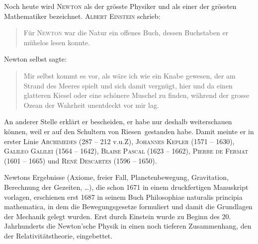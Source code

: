 \documentclass[%
11pt,%
twoside,%
titlepage,%
german,%
headsepline%
]{scrartcl}
\theoremstyle{definition}
\theoremstyle{plain}
\begin{document}
Noch heute wird \textsc{Newton} als der grösste Physiker und als einer der grössten Mathematiker bezeichnet. \textsc{Albert Einstein} schrieb:
\begin{quote}
\glqq Für \textsc{Newton} war die Natur ein offenes Buch, dessen Buchstaben er mühelos lesen konnte.\grqq
\end{quote}
Newton selbst sagte: 
\begin{quote}
\glqq Mir selbst kommt es vor, als wäre ich wie ein Knabe gewesen, der am Strand des Meeres spielt und sich damit vergnügt, hier und da einen glatteren Kiesel oder eine schönere Muschel zu finden, während der grosse Ozean der Wahrheit unentdeckt vor mir lag.\grqq
\end{quote}
An anderer Stelle erklärt er bescheiden, er habe nur deshalb weiterschauen können, weil er auf den \glqq Schultern von Riesen\grqq\ gestanden habe. Damit meinte er in erster Linie \textsc{Archimedes} (287 -- 212 v.u.Z), \textsc{Johannes Kepler} (1571 -- 1630), \textsc{Galileo Galilei} (1564 -- 1642), \textsc{Blaise Pascal} (1623 -- 1662), \textsc{Pierre de Fermat} (1601 -- 1665) und \textsc{Ren\'e Descartes} (1596 -- 1650).

Newtons Ergebnisse (Axiome, freier Fall, Planetenbewegung, Gravitation, Berechnung der Gezeiten, \dots), die schon 1671 in einem druckfertigen Manuskript vorlagen, erschienen erst 1687 in seinem Buch \glqq Philosophiae naturalis principia mathematica\grqq, in dem die Bewegungsgesetze formuliert und damit die Grundlagen der Mechanik gelegt wurden. Erst durch Einstein wurde zu Beginn des 20. Jahrhunderts die Newton'sche Physik in einen noch tieferen Zusammenhang, den der Relativitätstheorie, eingebettet.
\end{document}
